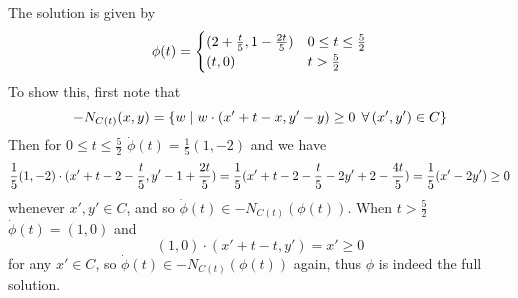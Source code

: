 \documentclass{article}
\newenvironment{ex}[1]
  {\renewcommand\theexercise{#1}\exercise}
  {\endexercise}
\begin{document}
\begin{ex}{8.26} %
  The solution is given by
  $$
  \phi(t) = \begin{cases}
    ( 2 + \frac{t}{5}, 1 - \frac{2t}{5} ) & 0 \le t \le \frac{5}{2} \\
    (t, 0) & t > \frac{5}{2}
  \end{cases}
  $$
  To show this, first note that
  $$
  -N_{C(t)}(x, y) = \braces{ w \mid w \cdot (x' + t - x, y' - y) \ge 0 \, \forall (x', y') \in C }
  $$
  Then for $0 \le t \le \frac{5}{2}$ $\dot{\phi}(t) = \frac{1}{5}(1, -2)$ and we have
  $$
  \frac{1}{5}(1, -2) \cdot (x' + t - 2 - \frac{t}{5}, y' - 1 + \frac{2t}{5}) = \frac{1}{5}( x' + t -2 - \frac{t}{5} - 2y' + 2 - \frac{4t}{5} ) = \frac{1}{5}(x' - 2y') \ge 0
  $$
  whenever $x', y' \in C$, and so $\dot{\phi}(t) \in - N_{C(t)}(\phi(t))$. When $t > \frac{5}{2}$ $\dot{\phi}(t) = (1, 0)$ and
  $$
  (1, 0) \cdot (x' + t - t, y') = x' \ge 0
  $$
  for any $x' \in C$, so $\dot{\phi}(t) \in -N_{C(t)}(\phi(t))$ again, thus $\phi$ is indeed the full solution.
\end{ex} %
\end{document}
